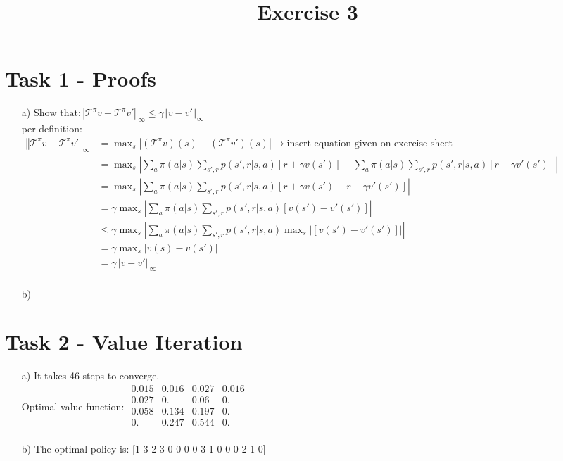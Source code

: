 \documentclass[a4paper]{article}
\date{}
\author{}
\title{\textbf{Exercise 3}}
\begin{document}
\maketitle 
\thispagestyle{fancy}

\section*{Task 1 - Proofs}

\begin{enumerate}
	\item[a)] $\text{Show that:} \left\Vert \mathcal{T}^\pi v - \mathcal{T}^\pi v' \right\Vert_\infty \leq \gamma \left \Vert v - v' \right \Vert_\infty$ \\ \linebreak
	per definition: \\
	$\begin{aligned}	
		\left\Vert \mathcal{T}^\pi v - \mathcal{T}^\pi v' \right\Vert_\infty  &= \max_s \left|(\mathcal{T}^\pi v )(s) -  (\mathcal{T}^\pi v' )(s) \right| \rightarrow \text{insert equation given on exercise sheet} \\
		&= \max_s \left| \sum_{a}\pi (a|s) \sum_{s',r}p(s',r |s,a)[r+\gamma v(s')] - \sum_{a}\pi (a|s) \sum_{s',r}p(s',r |s,a)[r+\gamma v'(s')] \right|  \\
		&= \max_s \left| \sum_{a}\pi (a|s) \sum_{s',r}p(s',r |s,a)[r+\gamma v(s') - r - \gamma v'(s')] \right| \\
		&= \gamma \max_s \left| \sum_{a}\pi (a|s) \sum_{s',r}p(s',r |s,a)[v(s') - v'(s')] \right| \\
		&\leq \gamma \max_s \left| \sum_{a}\pi (a|s) \sum_{s',r}p(s',r |s,a) \max_s \left| [v(s') - v'(s')] \right| \right| \\
		&= \gamma \max_s \left| v(s) - v(s') \right| \\
		&= \gamma \left \Vert v - v' \right \Vert_\infty \\
	\end{aligned}$
	
	\item[b)]
	
\end{enumerate}

\section*{Task 2 - Value Iteration}
\begin{enumerate}
	\item[a)] It takes 46 steps to converge. \\
	Optimal value function:
	$
	\begin{matrix} 
		0.015 & 0.016 & 0.027 & 0.016 \\
		0.027 & 0.    & 0.06  & 0.    \\
		0.058 & 0.134 & 0.197 & 0.    \\
		0.    & 0.247 & 0.544 & 0.    \\ 
	\end{matrix}
	$
	\item[b)] The optimal policy is: [1 3 2 3 0 0 0 0 3 1 0 0 0 2 1 0]
\end{enumerate}
\end{document}
